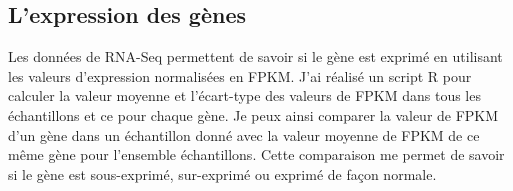 \subsection{L'expression des gènes}

Les données de RNA-Seq permettent de savoir si le gène est exprimé en utilisant les valeurs d'expression normalisées en FPKM. J'ai réalisé un script R pour calculer la valeur moyenne et l'écart-type des valeurs de FPKM dans tous les échantillons et ce pour chaque gène. Je peux ainsi comparer la valeur de FPKM d'un gène dans un échantillon donné avec la valeur moyenne de FPKM de ce même gène pour l'ensemble échantillons. Cette comparaison me permet de savoir si le gène est sous-exprimé, sur-exprimé ou exprimé de façon normale.



